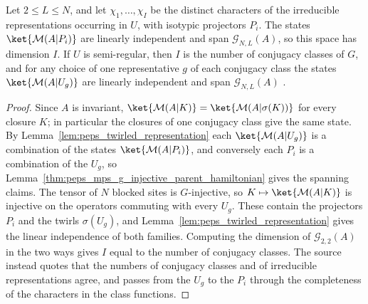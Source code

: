 \begin{theorem}%
    \label{thm:peps_mps_g_injective_ground_space_structure}
    \leanok
    Let $2\le L\le N$, and let $\chi_1,\dots,\chi_I$ be the distinct
    characters of the irreducible representations occurring in $U$, with
    isotypic projectors $P_i$. The states $\ket{\mathcal M(A|P_i)}$ are
    linearly independent and span $\mathcal G_{N,L}(A)$, so this space has
    dimension $I$. If $U$ is semi-regular, then $I$ is the number of conjugacy
    classes of $G$, and for any choice of one representative $g$ of each
    conjugacy class the states $\ket{\mathcal M(A|U_g)}$ are linearly
    independent and span $\mathcal G_{N,L}(A)$
    \cite[Theorem~4.12]{Schuch2010PEPS}.
\end{theorem}

\begin{proof}\leanok
    Since $A$ is invariant, $\ket{\mathcal M(A|K)}=\ket{\mathcal M(A|\sigma(K))}$
    for every closure $K$; in particular the closures of one conjugacy class
    give the same state. By Lemma~\ref{lem:peps_twirled_representation} each
    $\ket{\mathcal M(A|U_g)}$ is a combination of the states
    $\ket{\mathcal M(A|P_i)}$, and conversely each $P_i$ is a combination of
    the $U_g$, so Lemma~\ref{thm:peps_mps_g_injective_parent_hamiltonian}
    gives the spanning claims. The tensor of $N$ blocked sites is
    $G$-injective, so $K\mapsto\ket{\mathcal M(A|K)}$ is injective on the
    operators commuting with every $U_g$. These contain the projectors $P_i$
    and the twirls $\sigma(U_g)$, and
    Lemma~\ref{lem:peps_twirled_representation} gives the linear independence
    of both families. Computing the dimension of $\mathcal G_{2,2}(A)$ in the
    two ways gives $I$ equal to the number of conjugacy classes. The source
    instead quotes that the numbers of conjugacy classes and of irreducible
    representations agree, and passes from the $U_g$ to the $P_i$ through the
    completeness of the characters in the class functions.
\end{proof}
